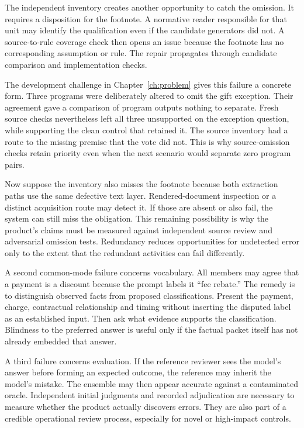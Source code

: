 The independent inventory creates another opportunity to catch the omission. It
requires a disposition for the footnote. A normative reader responsible for that
unit may identify the qualification even if the candidate generators did not.
A source-to-rule coverage check then opens an issue because the footnote has no
corresponding assumption or rule. The repair propagates through candidate
comparison and implementation checks.


The development challenge in Chapter~\ref{ch:problem} gives this failure a
concrete form. Three programs were deliberately altered to omit the gift
exception. Their agreement gave a comparison of program outputs nothing to
separate. Fresh source checks nevertheless left all three unsupported on the
exception question, while supporting the clean control that retained it. The
source inventory had a route to the missing premise that the vote did not.
This is why source-omission checks retain priority even when the next
scenario would separate zero program pairs.

Now suppose the inventory also misses the footnote because both extraction paths
use the same defective text layer. Rendered-document inspection or a distinct
acquisition route may detect it. If those are absent or also fail, the system can
still miss the obligation. This remaining possibility is why the product's
claims must be measured against independent source review and adversarial
omission tests. Redundancy reduces opportunities for undetected error only to
the extent that the redundant activities can fail differently.

A second common-mode failure concerns vocabulary. All members may agree that a
payment is a discount because the prompt labels it ``fee rebate.'' The remedy is
to distinguish observed facts from proposed classifications. Present the payment,
charge, contractual relationship and timing without inserting the disputed label
as an established input. Then ask what evidence supports the classification.
Blindness to the preferred answer is useful only if the factual packet itself
has not already embedded that answer.

A third failure concerns evaluation. If the reference reviewer sees the model's
answer before forming an expected outcome, the reference may inherit the model's
mistake. The ensemble may then appear accurate against a contaminated oracle.
Independent initial judgments and recorded adjudication are necessary to measure
whether the product actually discovers errors. They are also part of a credible
operational review process, especially for novel or high-impact controls.

